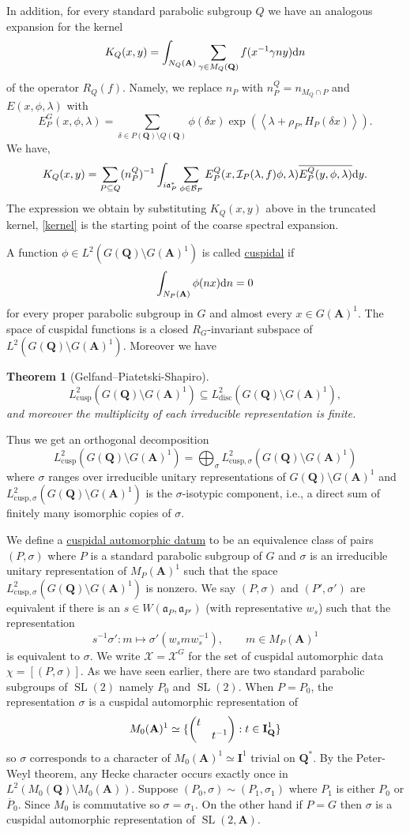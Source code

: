 \documentclass[11pt]{amsart}
\def\A{\mathbf A}
\def\I{\mathbf I}
\def\Q{\mathbf Q}
\def\BBB{\mathcal B}
\def\III{\mathcal I}
\def\XXX{\mathcal X}
\def\aaa{\mathfrak a}
\def\cb#1{{\color{black}#1}}
\def\d{\text d}
\def\bs{\setminus} 			%
\def\cusp{\text{cusp}}
\def\disc{\text{disc}}
\def\Ltwo{L^2}
\def\oP{\overline{P}}
\def\sl{\operatorname{SL}}
\def\sprod#1#2{\left\langle #1 , #2 \right\rangle}  %
\newtheorem{theorem}{Theorem}[section]
\theoremstyle{remark}
\begin{document}
In addition, for every standard parabolic subgroup $Q$ we have an analogous expansion for the kernel 
\[ K_Q(x, y) = \int_{N_Q(\A)} \sum_{\gamma \in M_Q(\Q)} f(x^{-1}\gamma n y) \d n \]
of the operator $R_Q(f)$. Namely, we replace $n_P$ with $n_P^Q = n_{M_Q \cap P}$ and $E(x, \phi, \lambda)$ with \[ E_P^G(x, \phi, \lambda) = \sum_{\delta \in P(\Q) \bs Q(\Q)} \phi(\delta x) \exp(\sprod{\lambda + \rho_P}{H_P(\delta x)}). \]
We have, 
\[ K_Q(x, y) = \sum_{P \subseteq Q} (n_P^Q)^{-1} \int_{i\aaa_P^*} \sum_{\phi \in \BBB_P}
		E_P^Q(x, \III_P(\lambda, f)\phi, \lambda) \overline{E_P^Q(y, \phi, \lambda)} \d y. \]
The expression we obtain by substituting $K_Q(x, y)$ above in the truncated kernel, \cref{kernel} is the starting point of the coarse spectral expansion. 

A function $\phi \in \Ltwo(G(\Q) \bs G(\A)^1)$ is called \underline{cuspidal} if 
\[ \int_{N_P(\A)} \phi(nx) \d n = 0 \]
for every proper parabolic subgroup in $G$ and almost every $x \in G(\A)^1$. The space of cuspidal functions is a closed $R_G$-invariant subspace of $\Ltwo(G(\Q)\bs G(\A)^1)$. Moreover we have
\begin{theorem} [Gelfand--Piatetski-Shapiro]
	\[ \Ltwo_\cusp(G(\Q)\bs G(\A)^1) \subseteq \Ltwo_\disc(G(\Q)\bs G(\A)^1), \]
	and moreover the multiplicity of each irreducible representation is finite. 
\end{theorem}
Thus we get an orthogonal decomposition
\[ \Ltwo_\cusp(G(\Q)\bs G(\A)^1) = \bigoplus_\sigma \Ltwo_{\cusp, \sigma} (G(\Q)\bs G(\A)^1) \]
where $\sigma$ ranges over irreducible unitary representations of $G(\Q)\bs G(\A)^1$ and $\Ltwo_{\cusp, \sigma} (G(\Q)\bs G(\A)^1)$ is the $\sigma$-isotypic component, i.e., a direct sum of finitely many isomorphic copies of $\sigma$. 

We define a \underline{cuspidal automorphic datum} to be an equivalence class of pairs $(P, \sigma)$ where $P$ is a standard parabolic subgroup of $G$ and $\sigma$ is an irreducible unitary representation of $M_P(\A)^1$ such that the space $\Ltwo_{\cusp, \sigma} (G(\Q)\bs G(\A)^1)$ is nonzero. We say $(P, \sigma)$ and $(P', \sigma')$ are equivalent if there is an $s \in W(\aaa_P, \aaa_{P'})$ (with representative $w_s$) such that the representation 
\[ s^{-1}\sigma' : m \mapsto \sigma'(w_s m w_s^{-1}), \qquad m \in M_P(\A)^1 \]
is equivalent to $\sigma$. We write $\XXX = \XXX^G$ for the set of cuspidal automorphic data $\chi = [(P, \sigma)]$. 
\cb{
As we have seen earlier, there are two standard parabolic subgroups of $\sl(2)$ namely $P_0$ and $\sl(2)$. When $P = P_0$, the representation $\sigma$ is a cuspidal automorphic representation of 
\[ M_0(\A)^1 \simeq \{ \begin{pmatrix} t & \\ & t^{-1} \end{pmatrix} : t \in \textbf I_\Q^1 \} \]
so $\sigma$ corresponds to a character of $M_0(\A)^1 \simeq \I^1$ trivial on $\Q^*$. By the Peter-Weyl theorem, any Hecke character occurs exactly once in $\Ltwo(M_0(\Q)\bs M_0(\A))$. Suppose $(P_0, \sigma) \sim (P_1, \sigma_1)$ where $P_1$ is either $P_0$ or $\oP_0$. Since $M_0$ is commutative so $\sigma = \sigma_1$. On the other hand if $P = G$ then $\sigma$ is a cuspidal automorphic representation of $\sl(2, \A)$.
}
\end{document}
